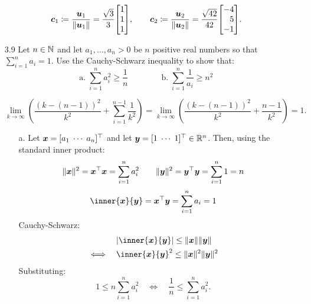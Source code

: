 \documentclass[11pt]{article}
\begin{document}
\begin{enumerate}
          \[
              \vect{c}_1
              \coloneq \frac{ \vect{u}_1 }{ \norm {\vect{u}_1} }
              = \frac{\sqrt{3}}{3} \!
              \begin{bmatrix}
                  1 \\ 1 \\ 1
              \end{bmatrix} \! ,
              \qquad
              \vect{c}_2
              \coloneq \frac{ \vect{u}_2 }{ \norm {\vect{u}_2} }
              = \frac{\sqrt{42}}{42} \!
              \begin{bmatrix*}[r]
                  -4 \\ 5 \\ -1
              \end{bmatrix*} \! .
          \]

    \item[3.9] Let $n \in \mathbb{N}$ and let $a_1, \ldots, a_n > 0$ be $n$ positive real numbers so that $\sum_{i = 1}^n a_i =
              1$.  Use the Cauchy-Schwarz inequality to show that:
          \[
              \text{a.} \; \sum_{i = 1}^n a_i^2 \geq \frac{1}{n}
              \qquad \qquad
              \text{b.} \; \sum_{i = 1}^n \frac{1}{a_i} \geq n^2
          \]

          \[
              \lim_{k \rightarrow \infty} \left( \frac{(k - (n - 1))^2}{k^2} + \sum_{i=1}^{n-1} \frac{1}{k^2} \right)
              = \lim_{k \rightarrow \infty} \left( \frac{(k - (n - 1))^2}{k^2} + \frac{n-1}{k^2} \right) = 1.
          \]

          \begin{enumerate}
              \item[a.] Let $\boldsymbol{x} = [ a_1 \; \cdots \; a_n ]^\top$ and let $\boldsymbol{y} = [ 1 \; \cdots \; 1 ]^\top \in \mathbb{R}^n$.
                    Then, using the standard inner product:
                    \[
                        \lVert\boldsymbol{x}\rVert^2
                        = \boldsymbol{x}^\top \boldsymbol{x}
                        = \sum_{i = 1}^n a_i^2
                        \qquad
                        \lVert\boldsymbol{y}\rVert^2
                        = \boldsymbol{y}^\top \boldsymbol{y}
                        = \sum_{i=1}^n 1 = n
                    \]
                    \[
                        \inner{\x}{\y}
                        = \x^\top \y
                        = \sum_{i=1}^n a_i = 1
                    \]
                    Cauchy-Schwarz:
                    \[
                        \begin{aligned}
                                       & \abs{\inner{\x}{\y}} \leq \norm{\x} \norm{\y} \\
                            \iff \quad & \inner{\x}{\y}^2 \leq \norm{\x}^2 \norm{\y}^2 \\
                        \end{aligned}
                    \]
                    Substituting:
                    \[
                        1 \leq n \sum_{i=1}^n a_i^2
                        \quad \iff \quad
                        \frac{1}{n} \leq \sum_{i=1}^n a_i^2.
                    \]


\end{enumerate}
\end{enumerate}
\end{document}
